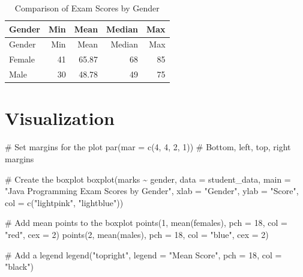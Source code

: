 \documentclass[
  letterpaper,
  DIV=11,
  numbers=noendperiod]{scrartcl}
\newenvironment{Shaded}{\begin{snugshade}}{\end{snugshade}}
\newcommand{\AttributeTok}[1]{\textcolor[rgb]{0.40,0.45,0.13}{#1}}
\newcommand{\CommentTok}[1]{\textcolor[rgb]{0.37,0.37,0.37}{#1}}
\newcommand{\DecValTok}[1]{\textcolor[rgb]{0.68,0.00,0.00}{#1}}
\newcommand{\FunctionTok}[1]{\textcolor[rgb]{0.28,0.35,0.67}{#1}}
\newcommand{\NormalTok}[1]{\textcolor[rgb]{0.00,0.23,0.31}{#1}}
\newcommand{\SpecialCharTok}[1]{\textcolor[rgb]{0.37,0.37,0.37}{#1}}
\newcommand{\StringTok}[1]{\textcolor[rgb]{0.13,0.47,0.30}{#1}}
\begin{document}
\begin{longtable}[]{@{}lrrrr@{}}
\caption{Comparison of Exam Scores by Gender}\tabularnewline
\toprule\noalign{}
Gender & Min & Mean & Median & Max \\
\midrule\noalign{}
\endfirsthead
\toprule\noalign{}
Gender & Min & Mean & Median & Max \\
\midrule\noalign{}
\endhead
\bottomrule\noalign{}
\endlastfoot
Female & 41 & 65.87 & 68 & 85 \\
Male & 30 & 48.78 & 49 & 75 \\
\end{longtable}

\section{Visualization}\label{visualization}

\begin{Shaded}
\begin{Highlighting}[]
\CommentTok{\# Set margins for the plot}
\FunctionTok{par}\NormalTok{(}\AttributeTok{mar =} \FunctionTok{c}\NormalTok{(}\DecValTok{4}\NormalTok{, }\DecValTok{4}\NormalTok{, }\DecValTok{2}\NormalTok{, }\DecValTok{1}\NormalTok{))  }\CommentTok{\# Bottom, left, top, right margins}

\CommentTok{\# Create the boxplot}
\FunctionTok{boxplot}\NormalTok{(marks }\SpecialCharTok{\textasciitilde{}}\NormalTok{ gender, }\AttributeTok{data =}\NormalTok{ student\_data, }
        \AttributeTok{main =} \StringTok{"Java Programming Exam Scores by Gender"}\NormalTok{,}
        \AttributeTok{xlab =} \StringTok{"Gender"}\NormalTok{, }\AttributeTok{ylab =} \StringTok{"Score"}\NormalTok{,}
        \AttributeTok{col =} \FunctionTok{c}\NormalTok{(}\StringTok{"lightpink"}\NormalTok{, }\StringTok{"lightblue"}\NormalTok{))}

\CommentTok{\# Add mean points to the boxplot}
\FunctionTok{points}\NormalTok{(}\DecValTok{1}\NormalTok{, }\FunctionTok{mean}\NormalTok{(females), }\AttributeTok{pch =} \DecValTok{18}\NormalTok{, }\AttributeTok{col =} \StringTok{"red"}\NormalTok{, }\AttributeTok{cex =} \DecValTok{2}\NormalTok{)}
\FunctionTok{points}\NormalTok{(}\DecValTok{2}\NormalTok{, }\FunctionTok{mean}\NormalTok{(males), }\AttributeTok{pch =} \DecValTok{18}\NormalTok{, }\AttributeTok{col =} \StringTok{"blue"}\NormalTok{, }\AttributeTok{cex =} \DecValTok{2}\NormalTok{)}

\CommentTok{\# Add a legend}
\FunctionTok{legend}\NormalTok{(}\StringTok{"topright"}\NormalTok{, }\AttributeTok{legend =} \StringTok{"Mean Score"}\NormalTok{, }\AttributeTok{pch =} \DecValTok{18}\NormalTok{, }\AttributeTok{col =} \StringTok{"black"}\NormalTok{)}
\end{Highlighting}
\end{Shaded}
\end{document}

